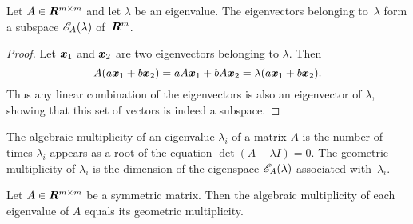 \begin{lemma}\label{lemma:eigenspace}
Let $A \in \bm{R}^{m \times m}$ and let $\lambda$ be an eigenvalue.
The eigenvectors belonging to~$\lambda$ form a subspace $\mathscr{E}_{A}(\lambda)$
of~$\bm{R}^m$.
\end{lemma}
\begin{proof}
Let $\boldsymbol{x}_1$ and $\boldsymbol{x}_2$ are two eigenvectors belonging to $\lambda$.
Then
\[
    A (a \boldsymbol{x}_1 + b \boldsymbol{x}_2) =
        a A \boldsymbol{x}_1 + b A \boldsymbol{x}_2 =
        \lambda (a \boldsymbol{x}_1 + b \boldsymbol{x}_2).
\]
Thus any linear combination of the eigenvectors is also an eigenvector of $\lambda$,
showing that this set of vectors is indeed a subspace.
\end{proof}

The algebraic multiplicity of an eigenvalue $\lambda_i$ of a matrix $A$
is the number of times
$\lambda_i$ appears as a root of the equation $\det (A - \lambda I) = 0$. The geometric
multiplicity of $\lambda_i$ is the dimension of the eigenspace $\mathscr{E}_{A}(\lambda)$
associated with~$\lambda_i$.
\begin{lemma}\label{lemma:alg_geom_mult}
Let $A \in \bm{R}^{m \times m}$ be a symmetric matrix. Then the algebraic multiplicity
of each eigenvalue of $A$ equals its geometric multiplicity.
\end{lemma}
